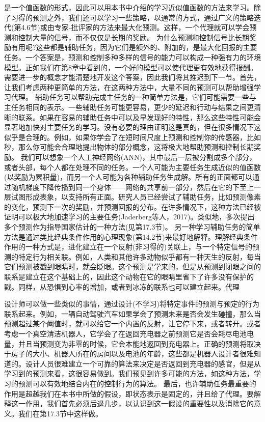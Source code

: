 是一个值函数的形式，因此可以用本书中介绍的学习近似值函数的方法来学习。除了习得的预测之外，我们还可以学习一些策略，以通常的方式，通过广义的策略迭代(第4.6节)或由专家-批评家的方法来最大化预测。这样，一个代理就可以学会预测和控制大量的信号，而不仅仅是长期的奖励。
为什么预测和控制信号比长期奖励有用呢?这些都是辅助任务，因为它们是额外的、附加的，是最大化回报的主要任务。一个答案是，预测和控制多种多样的信号的能力可以构成一种强有力的环境模型。正如我们在第8章中看到的，一个好的模型可以使代理更有效地获得报酬。需要进一步的概念才能清楚地开发这个答案，因此我们将其推迟到下一节。首先，让我们考虑两种更简单的方法，在这两种方法中，大量不同的预测可以帮助增强学习代理。
辅助任务可以帮助完成主任务的一种简单方法是，它们可能需要一些与主任务相同的表示。一些辅助任务可能更容易，更少的延迟和行动与结果之间更清晰的联系。如果在容易的辅助任务中可以及早发现好的特性，那么这些特性可能会显著地加快对主要任务的学习。没有必要的理由证明这是真的，但在很多情况下这似乎是合理的。例如，如果你学会了在短时间尺度上预测和控制你的传感器，比如秒，那么你可能会合理地提出物体的部分概念，这将极大地帮助预测和控制长期奖励。
我们可以想象一个人工神经网络(ANN)，其中最后一层被分割成多个部分，或者头部，每个人都在处理不同的任务。一个人可能为主要任务生成近似的值函数(以奖励为累积量)，而另一个人可能为各种辅助任务生成解。所有的正面都可以通过随机梯度下降传播到同一个身体——网络的共享前一部分，然后在它的下至上一层试图形成表象，以支持所有正面。研究人员已经尝试了辅助任务，比如预测像素的变化，预测下一次的奖励，并预测回报的分布。在许多情况下，这种方法已经被证明可以极大地加速学习的主要任务(Jaderberg等人，2017)。类似地，多次提出多个预测作为指导国家估计的一种方法(见第17.3节)。
另一种学习辅助任务的简单方法是通过类比经典条件作用的心理现象(第14.2节)来最好地解释。理解经典条件作用的一种方式是，进化建立在一个反射(非习得的)关联上，与一个特定信号的预测的特定行为相关联。例如，人类和其他许多动物似乎都有一种天生的反射，每当它们预测被戳到眼睛时，就会眨眼。这个预测是学来的，但是从预测到闭眼之间的联系是建立在这个基础上的，因此这个动物在它的眼睛里省下了许多没有保护的戳。同样，从恐惧到心率的增加，或者到冰冻的联系也可以建立起来。代理

设计师可以做一些类似的事情，通过设计(不学习)将特定事件的预测与预定的行为联系起来。例如，一辆自动驾驶汽车如果学会了预测未来是否会发生碰撞，那么当预测超过某个阈值时，就可以给它一个内置的反射，让它停下来，或者转开。或者考虑一个真空清洁机器人，它学会了在返回充电器之前预测它是否会耗尽电池电量，并且当预测变为非零的时候，它会本能地返回到充电器上。正确的预测将取决于房子的大小、机器人所在的房间以及电池的年龄，这些都是机器人设计者很难知道的。设计人员很难建立一个可靠的算法来决定是否返回到充电器的感官，但是从学习到的预测来看，这很容易做到。我们预见到许多可能的方法，如这种方法，学习的预测可以有效地结合内在的控制行为的算法。
最后，也许辅助任务最重要的作用是超越我们在本书中所做的假设，即状态表示是固定的，并且给了代理。要解释这一作用，我们首先必须后退几步，以认识到这一假设的重要性以及消除它的意义。我们在第17.3节中这样做。



